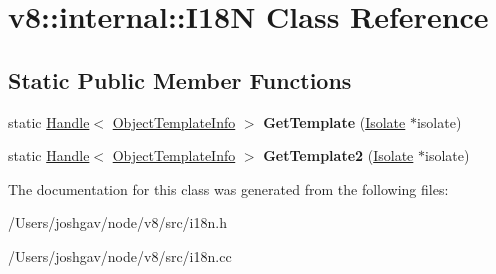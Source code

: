 \hypertarget{classv8_1_1internal_1_1_i18_n}{}\section{v8\+:\+:internal\+:\+:I18N Class Reference}
\label{classv8_1_1internal_1_1_i18_n}
\subsection*{Static Public Member Functions}
\begin{DoxyCompactItemize}
\item 
static \hyperlink{classv8_1_1internal_1_1_handle}{Handle}$<$ \hyperlink{classv8_1_1internal_1_1_object_template_info}{Object\+Template\+Info} $>$ {\bfseries Get\+Template} (\hyperlink{classv8_1_1internal_1_1_isolate}{Isolate} $\ast$isolate)\hypertarget{classv8_1_1internal_1_1_i18_n_a54e221e24c3dac93c7fbe406d395c893}{}\label{classv8_1_1internal_1_1_i18_n_a54e221e24c3dac93c7fbe406d395c893}

\item 
static \hyperlink{classv8_1_1internal_1_1_handle}{Handle}$<$ \hyperlink{classv8_1_1internal_1_1_object_template_info}{Object\+Template\+Info} $>$ {\bfseries Get\+Template2} (\hyperlink{classv8_1_1internal_1_1_isolate}{Isolate} $\ast$isolate)\hypertarget{classv8_1_1internal_1_1_i18_n_aa9bc46286cf0208bd8c0b85f90c4e936}{}\label{classv8_1_1internal_1_1_i18_n_aa9bc46286cf0208bd8c0b85f90c4e936}

\end{DoxyCompactItemize}


The documentation for this class was generated from the following files\+:\begin{DoxyCompactItemize}
\item 
/\+Users/joshgav/node/v8/src/i18n.\+h\item 
/\+Users/joshgav/node/v8/src/i18n.\+cc\end{DoxyCompactItemize}
